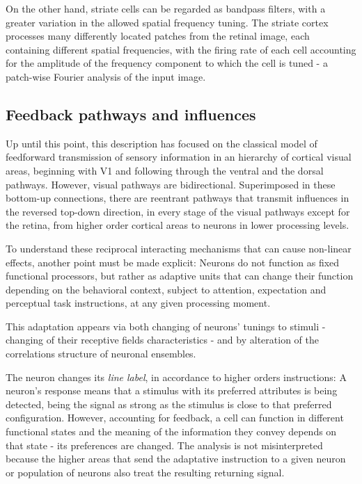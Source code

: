 On the other hand, striate cells can be regarded as bandpass filters, with a greater variation in the allowed spatial frequency tuning. 
The striate cortex processes many differently located patches from the retinal image, each containing different spatial frequencies, with the firing rate of each cell accounting for the amplitude of the frequency component to which the cell is tuned - a patch-wise Fourier analysis of the input image.


\subsection{Feedback pathways and influences}

Up until this point, this description has focused on the classical model of feedforward transmission of sensory information in an hierarchy of cortical visual areas, beginning with V1 and following through the ventral and the dorsal pathways.
However, visual pathways are bidirectional. Superimposed in these bottom-up connections, there are reentrant pathways that transmit influences in the reversed top-down direction, in every stage of the visual pathways except for the retina, from higher order cortical areas to neurons in lower processing levels.

To understand these reciprocal interacting mechanisms that can cause non-linear effects, another point must be made explicit: Neurons do not function as fixed functional processors, but rather as adaptive units that can change their function depending on the behavioral context, subject to attention, expectation and perceptual task instructions, at any given processing moment.

This adaptation appears via both changing of neurons' tunings to stimuli - changing of their receptive fields characteristics - and by alteration of the correlations structure of neuronal ensembles.

The neuron changes its \textit{line label}, in accordance to higher orders instructions: A neuron's response means that a stimulus with its preferred attributes is being detected, being the signal as strong as the stimulus is close to that preferred configuration. However, accounting for feedback, a cell can function in different functional states and the meaning of the information they convey depends on that state - its preferences are changed. The analysis is not misinterpreted because the higher areas that send the adaptative instruction to a given neuron or population of neurons also treat the resulting returning signal.


